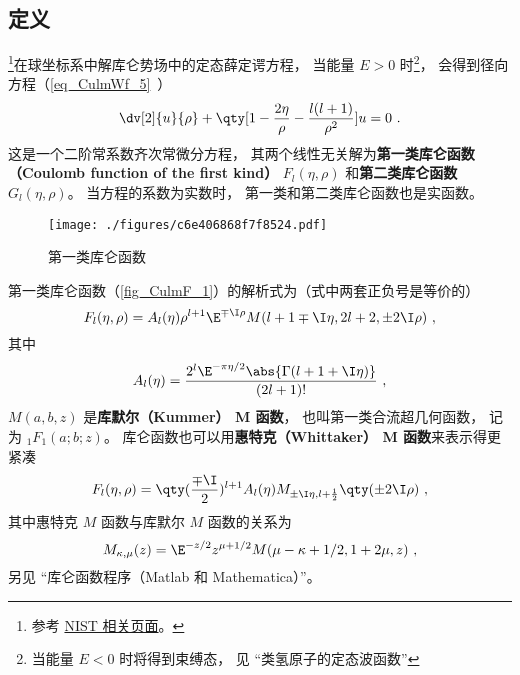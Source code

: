 

\subsection{定义}
\footnote{参考 \href{https://dlmf.nist.gov/33.2}{NIST 相关页面}。}在球坐标系中解库仑势场中的定态薛定谔方程， 当能量 $E > 0$ 时\footnote{当能量 $E < 0$ 时将得到束缚态， 见 “类氢原子的定态波函数”}， 会得到径向方程（\autoref{eq_CulmWf_5}~）
\begin{equation}
\dv[2]{u}{\rho} + \qty[1 - \frac{2\eta}{\rho} - \frac{l(l+1)}{\rho^2}]u = 0~.
\end{equation}
这是一个二阶常系数齐次常微分方程， 其两个线性无关解为\textbf{第一类库仑函数（Coulomb function of the first kind）} $F_l(\eta, \rho)$ 和\textbf{第二类库仑函数} $G_l(\eta, \rho)$。 当方程的系数为实数时， 第一类和第二类库仑函数也是实函数。

\begin{figure}[ht]
\centering
\texttt{[image: ./figures/c6e406868f7f8524.pdf]}
\caption{第一类库仑函数} \label{fig_CulmF_1}
\end{figure}

第一类库仑函数（\autoref{fig_CulmF_1}）的解析式为（式中两套正负号是等价的）
\begin{equation}\label{eq_CulmF_1}
F_l(\eta, \rho) = A_l(\eta) \rho^{l+1} \E^{\mp\I\rho} M(l+1\mp\I\eta, 2l+2, \pm 2\I\rho)~,
\end{equation}
其中
\begin{equation}
A_l(\eta) = \frac{2^l \E^{-\pi\eta/2} \abs{\Gamma(l+1+\I\eta)}}{(2l+1)!}~,
\end{equation}
$M(a, b, z)$ 是\textbf{库默尔（Kummer） M 函数}， 也叫第一类合流超几何函数， 记为 $_1 F_1(a;b;z)$。 库仑函数也可以用\textbf{惠特克（Whittaker） M 函数}来表示得更紧凑
\begin{equation}\label{eq_CulmF_2}
F_l(\eta, \rho) = \qty(\frac{\mp\I}{2})^{l+1} A_l(\eta) M_{\pm\I\eta, l+\frac12}\qty(\pm 2\I\rho)~,
\end{equation}
其中惠特克 $M$ 函数与库默尔 $M$ 函数的关系为
\begin{equation}
M_{\kappa, \mu}(z) = \E^{-z/2} z^{\mu + 1/2} M(\mu - \kappa + 1/2, 1 + 2\mu, z)~,
\end{equation}
另见 “库仑函数程序（Matlab 和 Mathematica）”。

